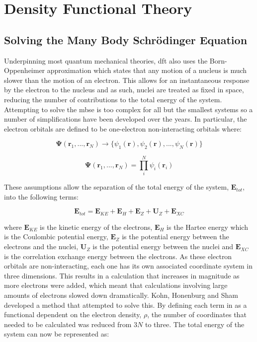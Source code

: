 \section{Density Functional Theory}
\label{sec:DFTheory}
\subsection{Solving the Many Body Schr\"{o}dinger Equation}
Underpinning most quantum mechanical theories, \acrshort{dft} also uses the Born\nobreakdash-Oppenheimer approximation which states that any motion of a nucleus is much slower than the motion of an electron. This allows for an instantaneous response by the electron to the nucleus and as such, nuclei are treated as fixed in space, reducing the number of contributions to the total energy of the system. Attempting to solve the \acrshort{mbse} is too complex for all but the smallest systems so a number of simplifications have been developed over the years. In particular, the electron orbitals are defined to be one-electron non-interacting orbitals where:

\begin{equation}
\boldsymbol{\Psi} (\mathbf{r}_1, ..., \mathbf{r}_N) \xrightarrow{} \{\psi_1(\mathbf{r}),  \psi_2(\mathbf{r}), ..., \psi_N(\mathbf{r})\}
\end{equation}

\begin{equation}
\boldsymbol{\Psi}(\mathbf{r}_1, ..., \mathbf{r}_N) = \prod_i^N \psi_i (\mathbf{r}_i)
\end{equation}

These assumptions allow the separation of the total energy of the system, \(\boldsymbol{E}_{tot}\), into the following terms:

\begin{equation}
\boldsymbol{E}_{tot} = \boldsymbol{E}_{KE} + \boldsymbol{E}_{H} + \boldsymbol{E}_{Z} + \boldsymbol{U}_{Z} + \boldsymbol{E}_{XC} 
\label{eqn:GSComponents}
\end{equation}

where \(\boldsymbol{E}_{KE}\) is the kinetic energy of the electrons, \(\boldsymbol{E}_{H}\) is the Hartee energy which is the Coulombic potential energy, \(\boldsymbol{E}_{Z}\) is the potential energy between the electrons and the nuclei, \(\boldsymbol{U}_{Z}\) is the potential energy between the nuclei and \(\boldsymbol{E}_{XC}\) is the correlation exchange energy between the electrons. As these electron orbitals are non-interacting, each one has its own associated coordinate system in three dimensions. This results in a calculation that increases in magnitude as more electrons were added, which meant that calculations involving large amounts of electrons slowed down dramatically. Kohn, Honenburg and Sham \DIFdelbegin \DIFdel{~}\DIFdelend \cite{Kohn1965, Hohenberg1964} developed a method that attempted to solve this. By defining each term in  as a functional dependent on the electron density, \(\rho\), the number of coordinates that needed to be calculated was reduced from \(3N\) to three. The total energy of the system can now be represented as:

